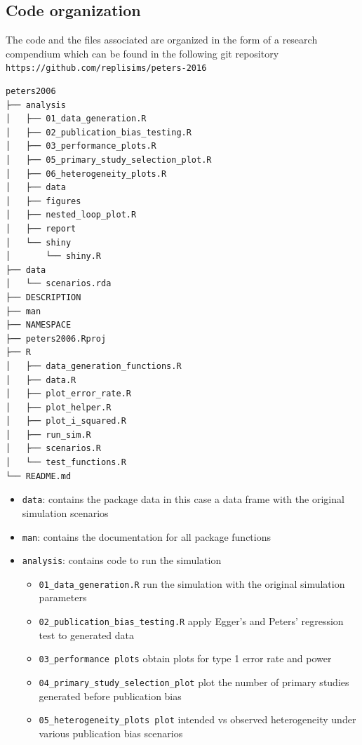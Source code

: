 \documentclass[
  english,
  doc,floatsintext,draftall]{apa6}
\providecommand{\tightlist}{%
  \setlength{\itemsep}{0pt}\setlength{\parskip}{0pt}}
\begin{document}
\hypertarget{code-organization}{%
\subsection{Code organization}\label{code-organization}}

The code and the files associated are organized in the form of a research compendium
which can be found in the following git repository \texttt{https://github.com/replisims/peters-2016}

\begin{minipage}{\linewidth}
\begin{verbatim}
peters2006
├── analysis
│   ├── 01_data_generation.R
│   ├── 02_publication_bias_testing.R
│   ├── 03_performance_plots.R
│   ├── 05_primary_study_selection_plot.R
│   ├── 06_heterogeneity_plots.R
│   ├── data
│   ├── figures
│   ├── nested_loop_plot.R
│   ├── report
│   └── shiny
│       └── shiny.R
├── data
│   └── scenarios.rda
├── DESCRIPTION
├── man
├── NAMESPACE
├── peters2006.Rproj
├── R
│   ├── data_generation_functions.R
│   ├── data.R
│   ├── plot_error_rate.R
│   ├── plot_helper.R
│   ├── plot_i_squared.R
│   ├── run_sim.R
│   ├── scenarios.R
│   └── test_functions.R
└── README.md
\end{verbatim}
\end{minipage}

\begin{itemize}
\tightlist
\item
  \texttt{data}: contains the package data in this case a data frame with the original simulation scenarios
\item
  \texttt{man}: contains the documentation for all package functions
\item
  \texttt{analysis}: contains code to run the simulation

  \begin{itemize}
  \tightlist
  \item
    \texttt{01\_data\_generation.R}
    run the simulation with the original simulation parameters
  \item
    \texttt{02\_publication\_bias\_testing.R}
    apply Egger's and Peters' regression test to generated data
  \item
    \texttt{03\_performance\ plots} obtain plots for type 1 error rate and power
  \item
    \texttt{04\_primary\_study\_selection\_plot} plot the number of primary studies generated before publication bias
  \item
    \texttt{05\_heterogeneity\_plots\ plot} intended vs observed heterogeneity under various publication bias scenarios
  \end{itemize}
\end{itemize}
\end{document}
